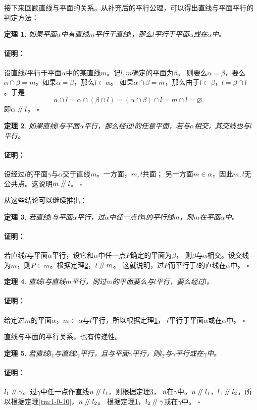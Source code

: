 \documentclass[12pt,UTF8]{ctexbook}
\newtheorem{tm}{定理}[section]
\renewenvironment{proof}{\paragraph{\textbf{证明：}}}{\hfill$\square$}
\renewcommand\parallel{\mathrel{/\mskip-4mu/}}
\begin{document}
接下来回顾直线与平面的关系。从补充后的平行公理，可以得出直线与平面平行的判定方法：

\begin{tm}\label{tm:1-0-20}
    如果平面$\alpha$中有直线$m$平行于直线$l$，那么$l$平行于平面$\alpha$或在$\alpha$中。
\end{tm}
\begin{proof}
    设直线$l$平行于平面$\alpha$中的某直线$m$。记$l,m$确定的平面为$\beta$。
    则要么$\alpha = \beta$，要么$\alpha\cap\beta = m$。如果$\alpha=\beta$，那么$l\subset\alpha$。
    如果$\alpha\cap\beta = m$，那么由于$l \subset \beta$，$l = \beta \cap l$。于是
    $$\alpha\cap l = \alpha\cap (\beta \cap l) = (\alpha\cap\beta) \cap l = m\cap l = \varnothing. $$
    即$\alpha \parallel l$。
\end{proof}
\begin{tm}\label{tm:1-0-30}
    如果直线$l$与平面$\alpha$平行，那么经过$l$的任意平面，若与$\alpha$相交，其交线也与$l$平行。
\end{tm}
\begin{proof}
    设经过$l$的平面$\gamma$与$\alpha$交于直线$m$。一方面，$m,l$共面；
    另一方面$m\in\alpha$，因此$m,l$无公共点。这说明$m\parallel l$。
\end{proof}

从这些结论可以继续推出：
\begin{tm}\label{tm:1-0-40}
    若直线$l$与平面$\alpha$平行，过$\alpha$中任一点作$l$的平行线$m$，则$m$在平面$\alpha$中。
\end{tm}
\begin{proof}
    若直线$l$与平面$\alpha$平行，设它和$\alpha$中任一点$P$确定的平面为$\beta$，
    则$\beta$与$\alpha$相交。设交线为$m$，则$P\in m$。根据定理\ref{tm:1-0-30}，$l\parallel m$。
    这就说明，过$P$而平行于$l$的直线在$\alpha$中。
\end{proof}
\begin{tm}\label{tm:1-0-41}
    直线$l$与直线$m$平行，则过$m$的平面要么与$l$平行，要么经过$l$。
\end{tm}
\begin{proof}
    给定过$m$的平面$\alpha$，$m\subset \alpha$与$l$平行，所以根据定理\ref{tm:1-0-20}，
    $l$平行于平面$\alpha$或在$\alpha$中。
\end{proof}

直线与平面的平行关系，也有传递性。
\begin{tm}
    若直线$l_1$与直线$l_2$平行，且与平面$\gamma$平行，则$l_2$与$\gamma$平行或在$\gamma$中。
\end{tm}
\begin{proof}
    $l_1\parallel \gamma$。过$\gamma$中任一点作直线$n\parallel l_1$，则根据定理\ref{tm:1-0-40}，
    $n$在$\gamma$中。$n\parallel l_1$，$l_1\parallel l_2$，所以根据定理\ref{tm:1-0-10}，$n\parallel l_2$。
    根据定理\ref{tm:1-0-20}，$l_2\parallel \gamma$或在$\gamma$中。
\end{proof}
\end{document}
